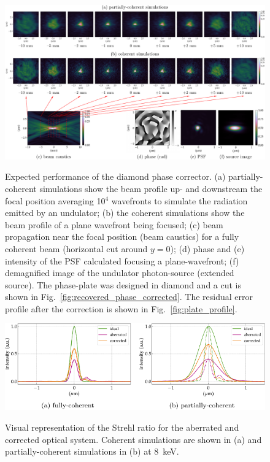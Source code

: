 \begin{refsection}
\begin{figure}[h]
        \centering
        {\includegraphics[width=0.99\linewidth]{figures/compressed/CDn_corrected.pdf}}
        \caption[Expected performance of the diamond phase corrector]{Expected performance of the diamond phase corrector. (a) partially-coherent simulations show the beam profile up- and downstream the focal position averaging 10$^{4}$ wavefronts to simulate the radiation emitted by an undulator; (b) the coherent simulations show the beam profile of a plane wavefront being focused; (c) beam propagation near the focal position (beam caustics) for a fully coherent beam (horizontal cut around $y=0$); (d) phase and (e) intensity of the PSF calculated focusing a plane-wavefront; (f) demagnified image of the undulator photon-source (extended source). The phase-plate was designed in diamond and a cut is shown in Fig.~\ref{fig:recovered_phase_corrected}. The residual error profile after the correction is shown in Fig.~\ref{fig:plate_profile}.}\label{fig:CDn_corrected}
\end{figure}

\begin{figure}[h]
        \centering
        {\includegraphics[width=0.7\linewidth]{figures/ch06/Strehl_correction.pdf}}
        \caption[Strehl ratio for the corrected system]{Visual representation of the Strehl ratio for the aberrated and corrected optical system. Coherent simulations are shown in (a) and partially-coherent simulations in (b) at 8~keV.}\label{fig:Strehl_correction}
\end{figure}


\end{refsection}
